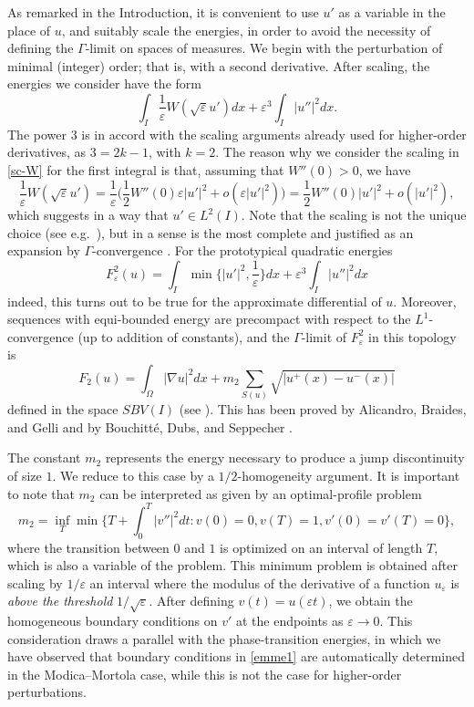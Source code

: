 \documentclass{article}
\newcommand{\e}{\varepsilon}
\begin{document}
As remarked in the Introduction, it is convenient to use $u'$ as a variable in the place of $u$, and suitably scale the energies, in order to avoid the necessity of defining the $\Gamma$-limit on spaces of measures.
We begin with the perturbation of minimal (integer) order; that is, with a second derivative. After scaling, the energies we consider have the form 
\begin{equation}\label{sc-W}
\int_I \frac1\e W(\sqrt\e u')dx+\e^3 \int_I|u''|^2dx.
\end{equation}
The power $3$ is in accord with the scaling arguments already used for higher-order derivatives, as $3=2k-1$, with  $k=2$.
The reason why we consider the scaling in \eqref{sc-W} for the first integral is that, assuming that $W''(0)>0$, we have 
$$
\frac1\e W(\sqrt\e u')=\frac1\e\Big(\frac12 W''(0)\e |u'|^2 + o(\e|u'|^2)\Big)=\frac12 W''(0) |u'|^2 + o(|u'|^2),
$$
which suggests in a way that $u'\in L^2(I)$. Note that the scaling is not the unique choice (see e.g.~\cite{GP-2}), but in a sense is the most complete and justified as an expansion by $\Gamma$-convergence \cite{BT}.
For the prototypical quadratic energies 
\begin{equation}
F^2_\e(u)=\int_I \min\Big\{|u'|^2,\frac1\e\Big\}dx+\e^3 \int_I|u''|^2dx 
\end{equation}
indeed, this turns out to be true for the approximate differential of $u$. Moreover, 
sequences with equi-bounded energy are precompact with respect to the $L^1$-convergence (up to addition of constants), and the $\Gamma$-limit of $F^2_\e$ in this topology is 
$$
F_2(u)=\int_\Omega|\nabla u|^2dx+ m_2\sum_{S(u)} \sqrt{|u^+(x)-u^-(x)|}
$$
defined in the space $SBV(I)$ (see \cite{bln}). This has been proved by  Alicandro, Braides, and Gelli \cite{ABG} and by Bouchitt\'e, Dubs, and Seppecher \cite{BDS}.


The constant $m_2$ represents the energy necessary to produce a jump discontinuity of size $1$. We reduce to this case by a $1/2$-homogeneity argument. It is important to note that $m_2$ can be interpreted as given by an optimal-profile problem
$$
m_2=\inf_T\min\bigg\{ T+\int_0^T|v''|^2dt: v(0)=0, v(T)=1, v'(0)=v'(T)=0\bigg\},
$$
where the transition between $0$ and $1$ is optimized on an interval of length $T$, which is also a variable of the problem. 
This minimum problem is obtained after scaling by $1/\e$ an interval where the modulus of the derivative of a function $u_\e$ is {\em above the threshold} $1/\sqrt\e$. After defining $v(t)=u(\e t)$, we obtain the homogeneous boundary conditions on $v'$ at the endpoints as $\e\to 0$. This consideration draws a parallel with the phase-transition energies,  in which we have observed that boundary conditions in \eqref{emme1} are automatically determined in the Modica--Mortola case, while this is not the case for higher-order perturbations. 
\end{document}
